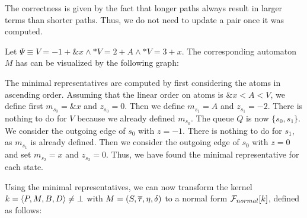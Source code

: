 The correctness is given by the fact that longer paths always result in larger terms than shorter paths.
Thus, we do not need to update a pair once it was computed.

\begin{example}\label{ex:min-repr}
    Let $\Psi \equiv V = -1 + \&x \land *V = 2 + A \land *V = 3 + x$.
    The corresponding automaton $M$ has can be visualized by the following graph:
    \begin{center}
    \end{center}

    The minimal representatives are computed by first considering the atoms in ascending order.
    Assuming that the linear order on atoms is $\&x < A < V$,
    we define first $m_{s_0} = \&x$ and $z_{s_0} = 0$.
    Then we define $m_{s_1} = A$ and $z_{s_1} = -2$.
    There is nothing to do for $V$ because we already defined $m_{s_0}$.
    The queue $Q$ is now $\{s_0, s_1\}$.
    We consider the outgoing edge of $s_0$ with $z = -1$.
    There is nothing to do for $s_1$, as $m_{s_1}$ is already defined.
    Then we consider the outgoing edge of $s_0$ with $z = 0$
    and set $m_{s_2} = x$ and $z_{s_2} = 0$.
    Thus, we have found the minimal representative for each state.
\end{example}
Using the minimal representatives, we can now transform the kernel $k = \langle P,M,B,D\rangle \neq \bot$ with $M = (S, \overline{\tau}, \eta, \delta)$ to a normal form $\mathcal{F}_{normal}[k]$,
defined as follows:

